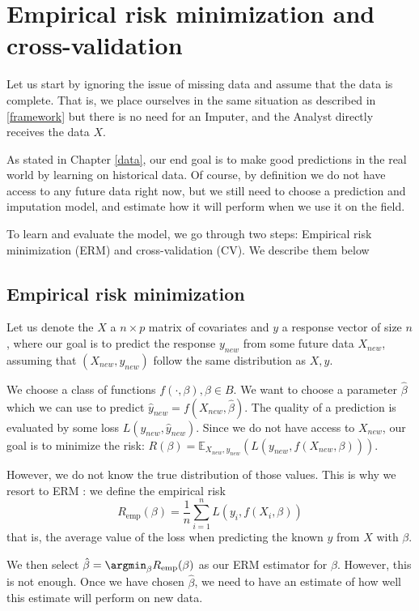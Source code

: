 	\section{Empirical risk minimization and cross-validation}
	\label{ERM}
Let us start by ignoring the issue of missing data and assume that the data is complete. That is, we place ourselves in the same situation as described in \ref{framework} but there is no need for an Imputer, and the Analyst directly receives the data $X$.
	
As stated in Chapter \ref{data}, our end goal is to make good predictions in the real world by learning on historical data. Of course, by definition we do not have access to any future data right now, but we still need to choose a prediction and imputation model, and estimate how it will perform when we use it on the field. 

To learn and evaluate the model, we go through two steps: Empirical risk minimization (ERM) and cross-validation (CV). We describe them below
		\subsection{Empirical risk minimization}
Let us denote the $X$ a $n \times p$ matrix of covariates and $y$ a response vector of size $n$, where our goal is to predict the response $y_{new}$ from some future data $X_{new}$, assuming that $(X_{new}, y_{new})$ follow the same distribution as $X,y$. 

We choose a class of functions $f(\cdot, \beta), \beta \in B$. We want to choose a parameter $\hat{\beta}$ which we can use to predict $\hat{y}_{new} = f(X_{new}, \hat{\beta})$. The quality of a prediction is evaluated by some loss $L(y_{new},\hat{y}_{new})$. Since we do not have access to $X_{new}$, our goal is to minimize the risk: $R(\beta) = \mathbb{E}_{X_{new},y_{new}}(L(y_{new}, f(X_{new}, \beta)))$.

However, we do not know the true distribution of those values. This is why we resort to ERM \cite{ERM}: we define the empirical risk
$$ R_{\text{emp}}(\beta) = \frac{1}{n} \sum\limits_{i=1}^n L(y_i, f(X_i, \beta))$$
that is, the average value of the loss when predicting the known $y$ from $X$ with $\beta$.

We then select $\hat{\beta} = \argmin_{\beta} R_{\text{emp}}(\beta)$ as our ERM estimator for $\beta$. However, this is not enough. Once we have chosen $\hat{\beta}$, we need to have an estimate of how well this estimate will perform on new data.

